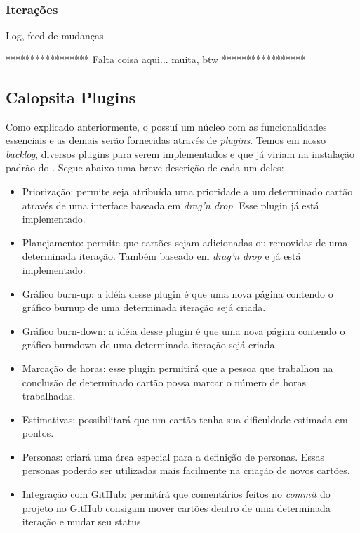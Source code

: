 \subsubsection*{Iterações}



Log, feed de mudanças

*****************
Falta coisa aqui... muita, btw
*****************

 

\subsection{Calopsita Plugins}

Como explicado anteriormente, o \calopsita{} possuí um núcleo com as funcionalidades essenciais e as demais serão fornecidas através de \textit{plugins}. Temos em nosso \textit{backlog}, diversos plugins para serem implementados e que já viriam na instalação padrão do \calopsita{}. Segue abaixo uma breve descrição de cada um deles:

\begin{itemize}
	\item{Priorização: permite seja atribuída uma prioridade a um determinado cartão através de uma interface baseada em \textit{drag'n drop}. Esse plugin já está implementado.}
	\item{Planejamento: permite que cartões sejam adicionadas ou removidas de uma determinada iteração. Também baseado em \textit{drag'n drop} e já está implementado.}
	\item{Gráfico burn-up: a idéia desse plugin é que uma nova página contendo o gráfico burnup de uma determinada iteração sejá criada.}
	\item{Gráfico burn-down: a idéia desse plugin é que uma nova página contendo o gráfico burndown de uma determinada iteração sejá criada.}
	\item{Marcação de horas: esse plugin permitirá que a pessoa que trabalhou na conclusão de determinado cartão possa marcar o número de horas trabalhadas.}
	\item{Estimativas: possibilitará que um cartão tenha sua dificuldade estimada em pontos.}
	\item{Personas: criará uma área especial para a definição de personas. Essas personas poderão ser utilizadas mais facilmente na criação de novos cartões.}
	\item{Integração com GitHub: permitírá que comentários feitos no \textit{commit} do projeto no GitHub consigam mover cartões dentro de uma determinada iteração e mudar seu status.}
\end{itemize}


